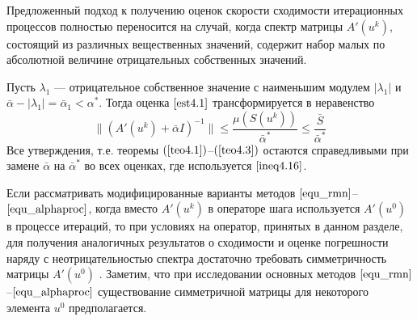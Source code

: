 {\remark Предложенный подход к получению оценок скорости сходимости итерационных процессов полностью переносится на случай, когда спектр матрицы $A'(u^k)$, состоящий из различных вещественных значений, содержит набор малых по абсолютной величине отрицательных собственных значений.} 

Пусть $\lambda _1$ --- отрицательное собственное значение с наименьшим модулем $|\lambda_1|$ и $\bar\alpha -|\lambda _1|=\bar\alpha _1<\alpha^*$. Тогда оценка $\eqref{est4.1}$ трансформируется в неравенство
\begin{equation}\label{ineq4.16}
\|(A'(u^k)+\bar\alpha I)^{-1}\|\le\frac{\mu(S(u^k))}{\bar\alpha^*}\le\frac{\bar S}{\bar\alpha^*}
\end{equation}
Все утверждения, т.е. теоремы $(\ref{teo4.1})$--$(\ref{teo4.3})$ остаются справедливыми при замене $\bar\alpha$ на $\bar\alpha^*$ во всех оценках, где используется $\eqref{ineq4.16}$.

{\remark Если рассматривать модифицированные варианты методов $\eqref{equ_rmn}$--$\eqref{equ_alphaproc}$, когда вместо $A'(u^k)$ в операторе шага используется $A'(u^0)$ в процессе итераций, то при условиях на оператор, принятых в данном разделе, для получения аналогичных результатов о сходимости и оценке погрешности наряду с неотрицательностью спектра достаточно требовать симметричность матрицы $A'(u^0)$ \cite{VasAkiMin2013, Vasin2014, Vasin2016}. Заметим, что при исследовании основных методов $\eqref{equ_rmn}$--$\eqref{equ_alphaproc}$ существование симметричной матрицы для некоторого элемента $u^0$ предполагается.}

\newpage
